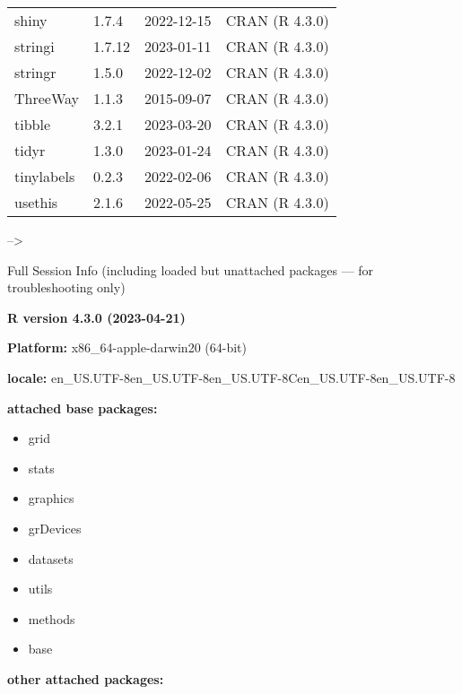 \documentclass[
]{article}
\providecommand{\tightlist}{%
  \setlength{\itemsep}{0pt}\setlength{\parskip}{0pt}}
\begin{document}
\begin{table}
\begin{tabular}[t]{llll}
shiny & 1.7.4 & 2022-12-15 & CRAN (R 4.3.0)\\
\addlinespace
stringi & 1.7.12 & 2023-01-11 & CRAN (R 4.3.0)\\
stringr & 1.5.0 & 2022-12-02 & CRAN (R 4.3.0)\\
ThreeWay & 1.1.3 & 2015-09-07 & CRAN (R 4.3.0)\\
tibble & 3.2.1 & 2023-03-20 & CRAN (R 4.3.0)\\
tidyr & 1.3.0 & 2023-01-24 & CRAN (R 4.3.0)\\
\addlinespace
tinylabels & 0.2.3 & 2022-02-06 & CRAN (R 4.3.0)\\
usethis & 2.1.6 & 2022-05-25 & CRAN (R 4.3.0)\\
\bottomrule
\end{tabular}
\end{table}

--\textgreater{}

Full Session Info (including loaded but unattached packages --- for
troubleshooting only)

\textbf{R version 4.3.0 (2023-04-21)}

\textbf{Platform:} x86\_64-apple-darwin20 (64-bit)

\textbf{locale:}
en\_US.UTF-8\textbar\textbar en\_US.UTF-8\textbar\textbar en\_US.UTF-8\textbar\textbar C\textbar\textbar en\_US.UTF-8\textbar\textbar en\_US.UTF-8

\textbf{attached base packages:}

\begin{itemize}
\tightlist
\item
  grid
\item
  stats
\item
  graphics
\item
  grDevices
\item
  datasets
\item
  utils
\item
  methods
\item
  base
\end{itemize}

\textbf{other attached packages:}
\end{document}
